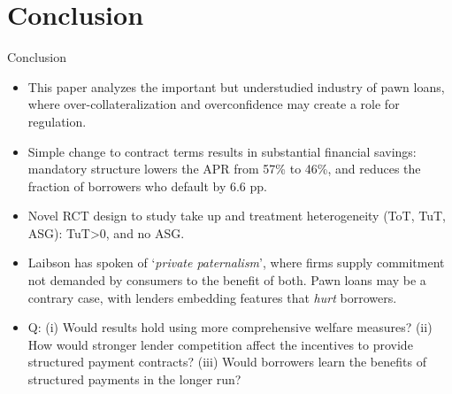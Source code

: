 \documentclass[9pt, aspectratio=169]{beamer}
\begin{document}



\section{Conclusion}
\begin{frame}{Conclusion}
    \begin{itemize}
     \item This paper analyzes the important but understudied industry of pawn loans, where over-collateralization and overconfidence may create a role for regulation.
     \vfill \item Simple change to contract terms results in substantial financial savings: mandatory structure lowers the APR from 57\% to 46\%, and reduces the fraction of borrowers who default by 6.6 pp.
    \vfill \item Novel RCT design to study take up and treatment heterogeneity (ToT, TuT, ASG): TuT>0, and no ASG. 
     \vfill \item Laibson has spoken of `\textit{private paternalism}', where firms supply commitment not demanded by consumers to the benefit of both. Pawn loans may be a contrary case, with lenders embedding features that \textit{hurt} borrowers.
     \vfill \item Q: (i) Would results hold using more comprehensive welfare measures? (ii) How would stronger lender competition affect the incentives to provide structured payment contracts? (iii) Would borrowers learn the benefits of structured payments in the longer run? 
    \end{itemize}  
\end{frame}
\end{document}
